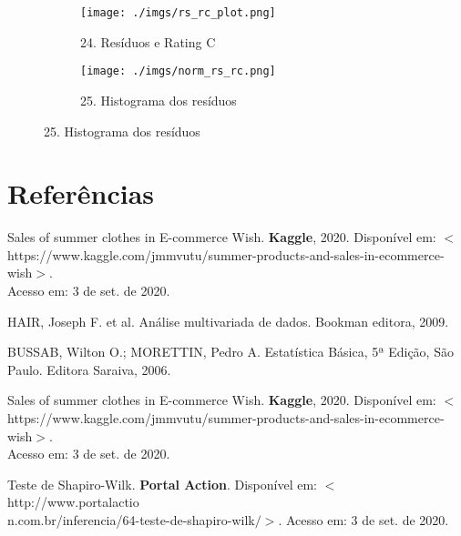 \documentclass[12pt, a4paper]{article}
\begin{document}
\FloatBarrier
\begin{figure}[h]
  \begin{subfigure}[b]{0.4\textwidth}
    \texttt{[image: ./imgs/rs\_rc\_plot.png]}
    \caption*{24. Resíduos e Rating C}
    \label{fig:1}
  \end{subfigure}
  \hspace{1.5cm}
  \begin{subfigure}[b]{0.5\textwidth}
    \texttt{[image: ./imgs/norm\_rs\_rc.png]}
    \caption*{25. Histograma dos resíduos}
    \label{fig:2}
  \end{subfigure}
\end{figure}
\FloatBarrier 

\section{Referências}  
       
   	Sales of summer clothes in E-commerce Wish. \textbf{Kaggle}, 2020. Disponível em: $<$https://www.kaggle.\/\/com/jmmvutu/summer-products-and-sales-in-ecommerce-wish$>$.\\Acesso em: 3 de set. de 2020.
   	
   	HAIR, Joseph F. et al. Análise multivariada de dados. Bookman editora, 2009.
   	
	BUSSAB, Wilton O.; MORETTIN, Pedro A. Estatística Básica, 5ª Edição, São Paulo. Editora Saraiva, 2006.
	
	Sales of summer clothes in E-commerce Wish. \textbf{Kaggle}, 2020. Disponível em: $<$https://www.kaggle.\/\/com/jmmvutu/summer-products-and-sales-in-ecommerce-wish$>$.\\Acesso em: 3 de set. de 2020.
	
	Teste de Shapiro-Wilk. \textbf{Portal Action}. Disponível em: $<$    
    http://www.portalactio\\n.com.br/inferencia/64-teste-de-shapiro-wilk$/>$. Acesso em: 3 de set. de 2020.
\end{document}
